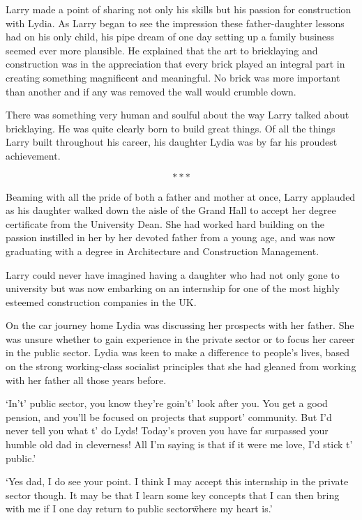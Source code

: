 Larry made a point of sharing not only his skills but his passion for
construction with Lydia. As Larry began to see the impression these
father-daughter lessons had on his only child, his pipe dream of one
day setting up a family business seemed ever more plausible.
He explained that the art to bricklaying and %
construction was in the appreciation that every brick played an
integral part in creating something magnificent and meaningful. No
brick was more important than another and if any was removed the wall
would crumble down.

There was something very human and soulful about the way Larry talked
about bricklaying. He was quite clearly born to build great things. Of
all the things Larry built throughout his career, his daughter Lydia
was by far his proudest achievement.

\[***\]

Beaming with all the pride of both a father and mother at once, Larry
applauded as his daughter walked down the aisle of the Grand Hall to
accept her degree certificate from the University Dean. She had worked
hard building on the passion instilled in her by her devoted father
from a young age, and was now graduating with a degree in Architecture
and Construction Management.

Larry could never have imagined having a daughter who had not only
gone to university but was now embarking on an internship for one of
the most highly esteemed construction companies in the UK.

On the car journey home Lydia was discussing her prospects with her
father. She was unsure whether to gain experience in the private
sector or to focus her career in the public sector. Lydia was keen to
make a difference to people's lives, based on the strong working-class
socialist principles that she had gleaned from working with her father
all those years before.

`In't' public sector, you know they're goin't' look after you. You get
a good pension, and you'll be focused on projects that support'
community. But I'd never tell you what t' do Lyds! Today's proven you
have far surpassed your humble old dad in cleverness! All I'm saying
is that if it were me love, I'd stick t' public.'

`Yes dad, I do see your point. I think I may accept this internship in
the private sector though. It may be that I learn some key concepts
that I can then bring with me if I one day return to public
sector\=where my heart is.'

